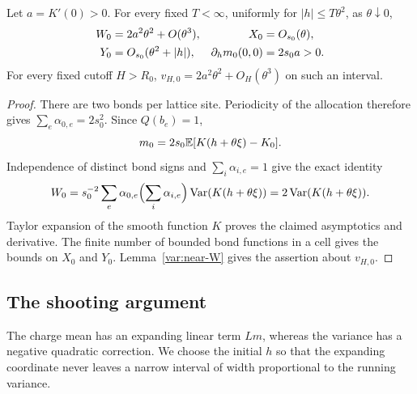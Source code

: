 \begin{lemma}\label{traj:initialization}
Let $a=K'(0)>0$.  For every fixed $T<\infty$, uniformly for
$|h|\le T\theta^2$, as $\theta\downarrow0$,
\begin{align}
 W_0&=2a^2\theta^2+O(\theta^3),&
 X_0&=O_{s_0}(\theta),\notag\\
 Y_0&=O_{s_0}(\theta^2+|h|),&
 \partial_hm_0(0,0)&=2s_0a>0.
 \label{traj:initial-bounds}
\end{align}
For every fixed cutoff $H>R_0$,
$v_{H,0}=2a^2\theta^2+O_H(\theta^3)$ on such an interval.
\end{lemma}
\begin{proof}
There are two bonds per lattice site.  Periodicity of the allocation
therefore gives $\sum_e\alpha_{0,e}=2s_0^2$.  Since $Q(b_e)=1$,
\[
 m_0=2s_0\mathbb E[K(h+\theta\xi)-K_0].
\]
Independence of distinct bond signs and $\sum_i\alpha_{i,e}=1$ give
the exact identity
\[
 W_0=s_0^{-2}\sum_e\alpha_{0,e}
       \Bigl(\sum_i\alpha_{i,e}\Bigr)\operatorname{Var}(K(h+\theta\xi))
     =2\operatorname{Var}(K(h+\theta\xi)).
\]
Taylor expansion of the smooth function $K$ proves the claimed
asymptotics and derivative.  The finite number of bounded bond
functions in a cell gives the bounds on $X_0$ and $Y_0$.
Lemma~\ref{var:near-W} gives the assertion about $v_{H,0}$.
\end{proof}

\subsection{The shooting argument}

The charge mean has an expanding linear term $Lm$, whereas the
variance has a negative quadratic correction.  We choose the initial
$h$ so that the expanding coordinate never leaves a narrow interval
of width proportional to the running variance.


